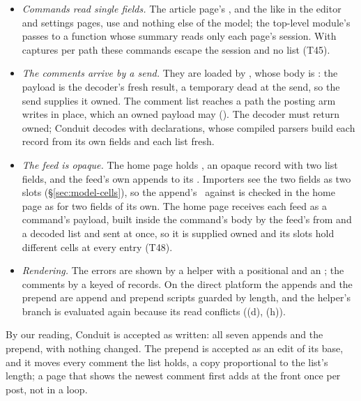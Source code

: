\begin{itemize}
\item \emph{Commands read single fields.} The article page's
,
and the like in the editor and settings pages, use  and nothing else of the model; the
top-level module's  passes
 to a function whose summary reads only each page's session. With captures per path these
commands escape the session and no list (T45).
\item \emph{The comments arrive by a send.} They are loaded by , whose body is : the payload is the decoder's fresh
result, a temporary dead at the send, so the send supplies it owned. The comment list reaches a path the
posting arm writes in place, which an owned payload may (). The decoder must return owned; Conduit
decodes with  declarations, whose compiled parsers build each record from its own fields and
each list fresh.
\item \emph{The feed is opaque.} The home page holds , an opaque record with two list
fields, and the feed's own  appends to its . Importers see the two fields as two
slots (\S\ref{sec:model-cells}), so the append's \Disjoint\ against  is checked in the home
page as for two fields of its own. The home page receives each feed as a command's payload, built inside
the command's body by the feed's  from \code{[]} and a decoded list and sent at once, so it is
supplied owned and its slots hold different cells at every entry (T48).
\item \emph{Rendering.} The errors are shown by a helper with a positional  and an
; the comments by a keyed  of records. On the direct platform the
appends and the prepend are append and prepend scripts guarded by length, and the helper's branch is
evaluated again because its read conflicts ((d), (h)).
\end{itemize}
By our reading, Conduit is accepted as written: all seven appends and the prepend, with nothing changed.
The prepend is accepted as an edit of its base, and it moves every comment the list holds, a copy
proportional to the list's length; a page that shows the newest comment first adds at the front once per
post, not in a loop.

